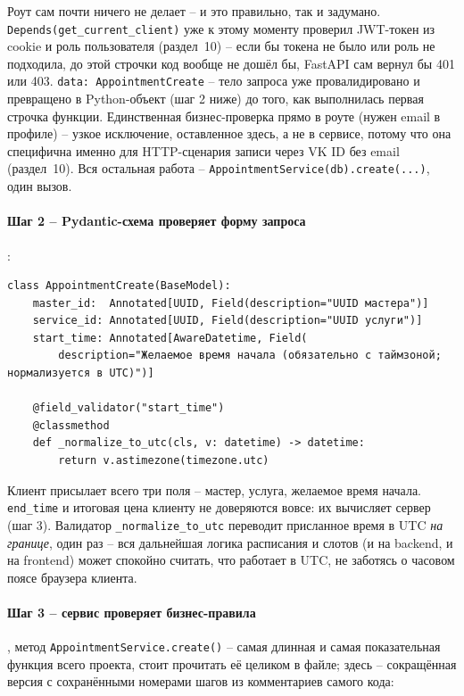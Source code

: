 Роут сам почти ничего не делает -- и это правильно, так и задумано.
\texttt{Depends(get_current_client)} уже к этому моменту проверил
JWT-токен из cookie и роль пользователя (раздел~10) -- если бы токена не
было или роль не подходила, до этой строчки код вообще не дошёл бы, FastAPI
сам вернул бы 401 или 403. \texttt{data: AppointmentCreate} -- тело
запроса уже провалидировано и превращено в Python-объект (шаг 2 ниже) до
того, как выполнилась первая строчка функции. Единственная бизнес-проверка
прямо в роуте (нужен email в профиле) -- узкое исключение, оставленное
здесь, а не в сервисе, потому что она специфична именно для HTTP-сценария
записи через VK ID без email (раздел~10). Вся остальная работа --
\texttt{AppointmentService(db).create(...)}, один вызов.

\paragraph{Шаг 2 -- Pydantic-схема проверяет форму запроса}
:

\begin{verbatim}
class AppointmentCreate(BaseModel):
    master_id:  Annotated[UUID, Field(description="UUID мастера")]
    service_id: Annotated[UUID, Field(description="UUID услуги")]
    start_time: Annotated[AwareDatetime, Field(
        description="Желаемое время начала (обязательно с таймзоной; нормализуется в UTC)")]

    @field_validator("start_time")
    @classmethod
    def _normalize_to_utc(cls, v: datetime) -> datetime:
        return v.astimezone(timezone.utc)
\end{verbatim}

Клиент присылает всего три поля -- мастер, услуга, желаемое время
начала. \texttt{end_time} и итоговая цена клиенту не доверяются вовсе:
их вычисляет сервер (шаг 3). Валидатор \texttt{_normalize_to_utc}
переводит присланное время в UTC \emph{на границе}, один раз -- вся
дальнейшая логика расписания и слотов (и на backend, и на frontend) может
спокойно считать, что работает в UTC, не заботясь о часовом поясе
браузера клиента.

\paragraph{Шаг 3 -- сервис проверяет бизнес-правила}
,
метод \texttt{AppointmentService.create()} -- самая длинная и самая
показательная функция всего проекта, стоит прочитать её целиком в файле;
здесь -- сокращённая версия с сохранёнными номерами шагов из комментариев
самого кода:

